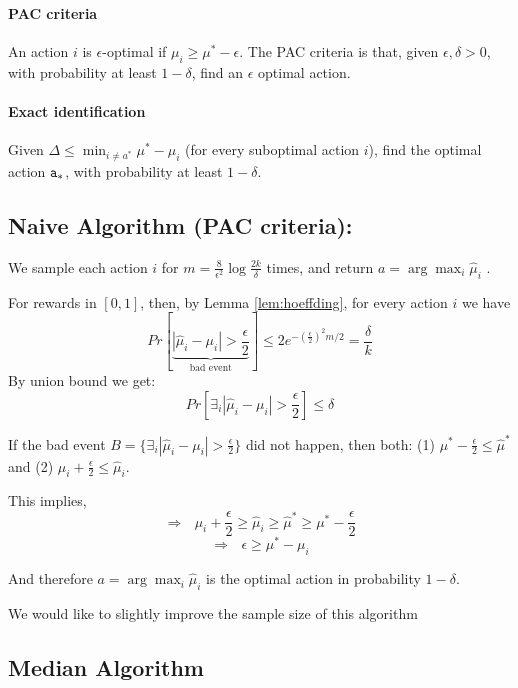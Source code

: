 \paragraph{PAC criteria }
An action $i$ is $\epsilon$-optimal if  $\mu_i\geq \mu^*-\epsilon$. The PAC criteria is
that, given $\epsilon,\delta>0$, with probability at least
$1-\delta$, find an $\epsilon$ optimal action.

\paragraph{Exact identification}
Given $\Delta\le\min_{i\neq a^*}\mu^{*}-\mu_{i}$ (for every suboptimal action $i$),
find the optimal action ${\tt a}_{*}$, with probability at least
$1-\delta$.

\subsection{Naive Algorithm (PAC criteria):}

We sample each action $i$ for
$m=\frac{8}{\epsilon^{2}}\log\frac{2k}{\delta}$ times, and return
$a= \arg\max_{i}\hat{\mu}_{i}$ .

For rewards in $[ 0 ,1]$, then, by Lemma \ref{lem:hoeffding}, for
every action $i$ we have
\[
Pr\left[\underbrace{\left|\hat{\mu}_{i}-\mu_{i}\right|>\frac{\epsilon}{2}}_{\text{bad
event}}\right]\le 2
e^{-\left(\frac{\epsilon}{2}\right)^{2}m/2}=\frac{\delta}{k}
\]
By union bound we get:
\[
Pr\left[\exists_{i}\left|\hat{\mu}_{i}-\mu_{i}\right|>\frac{\epsilon}{2}\right]\le\delta
\]

If the bad event
$B=\{\exists_{i}\left|\hat{\mu}_{i}-\mu_{i}\right|>\frac{\epsilon}{2}\}$
did not happen, then both: (1)
$\mu^{*}-\frac{\epsilon}{2}\le\hat{\mu}^{*}$ and (2)
$\mu_{i}+\frac{\epsilon}{2}\le\hat{\mu}_{i}$.

This implies,
\[
\Rightarrow\text{ }\mu_{i}+\frac{\epsilon}{2}\ge\hat{\mu}_{i}\ge\hat{\mu}^{*}\ge\mu^{*}-\frac{\epsilon}{2}
\]
\[
\Rightarrow\text{ }\epsilon\ge\mu^{*}-\mu_{i}
\]

And therefore $a={\displaystyle \arg\max_{i}\hat{\mu}_{i}}$ is the
optimal action in probability $1-\delta$.

We would like to slightly improve the sample size of this algorithm

\subsection{Median Algorithm}

